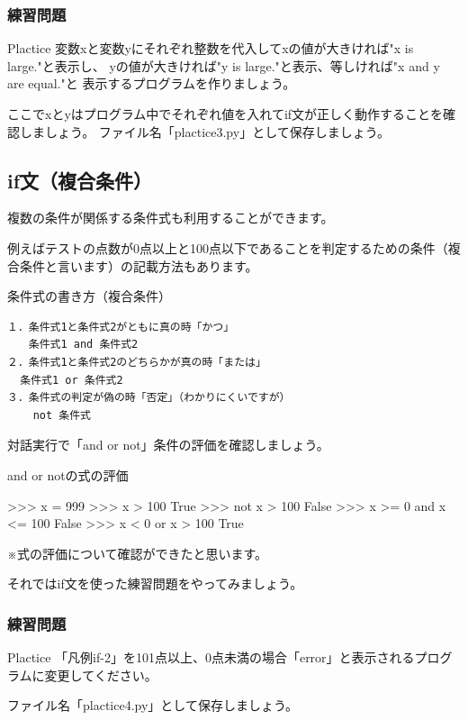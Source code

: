 \documentclass[11pt,a4paper,dvipdfmx,titlepage]{jsreport}
\begin{document}
\subsubsection{練習問題}
\begin{plabox}{Plactice}
変数xと変数yにそれぞれ整数を代入してxの値が大きければ"x is large."と表示し、
yの値が大きければ"y is large."と表示、等しければ"x and y are equal."と
表示するプログラムを作りましょう。

ここでxとyはプログラム中でそれぞれ値を入れてif文が正しく動作することを確認しましょう。
ファイル名「plactice3.py」として保存しましょう。
\end{plabox}
\subsection{if文（複合条件）}
複数の条件が関係する条件式も利用することができます。

例えばテストの点数が0点以上と100点以下であることを判定するための条件（複合条件と言います）の記載方法もあります。

\begin{grabox}{条件式の書き方（複合条件）}
\begin{verbatim}
１．条件式1と条件式2がともに真の時「かつ」
　　条件式1 and 条件式2
２．条件式1と条件式2のどちらかが真の時「または」
  条件式1 or 条件式2
３．条件式の判定が偽の時「否定」（わかりにくいですが）
    not 条件式
\end{verbatim}

\end{grabox}

 {\gt 対話実行}で「and or not」条件の評価を確認しましょう。

\begin{grabox}{and or notの式の評価}
\begin{listing}{1}
>>> x = 999
>>> x > 100
True
>>> not x > 100
False
>>> x >= 0 and x <= 100
False
>>> x < 0 or x > 100
True

\end{listing}
\end{grabox}
※式の評価について確認ができたと思います。


それではif文を使った練習問題をやってみましょう。

\subsubsection{練習問題}
\begin{plabox}{Plactice}
「凡例if-2」を101点以上、0点未満の場合「error」と表示されるプログラムに変更してください。

ファイル名「plactice4.py」として保存しましょう。
\end{plabox}
\end{document}
